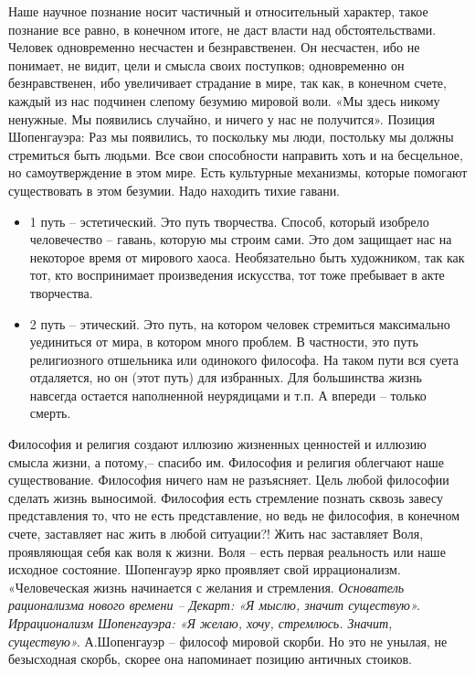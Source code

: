 \documentclass[12pt]{article}
\begin{document}
Наше научное познание носит частичный и относительный характер, такое познание все равно, в конечном
итоге, не даст власти над обстоятельствами. Человек одновременно несчастен и безнравственен. Он несчастен,
ибо не понимает, не видит, цели и смысла своих поступков; одновременно он безнравственен, ибо увеличивает
страдание в мире, так как, в конечном счете, каждый из нас подчинен слепому безумию мировой воли.
«Мы здесь никому ненужные. Мы появились случайно, и ничего у нас не получится».
Позиция Шопенгауэра: Раз мы появились, то поскольку мы люди, постольку мы должны стремиться быть
людьми.  Все  свои  способности  направить  хоть  и  на  бесцельное,  но  самоутверждение  в  этом  мире.  Есть
культурные механизмы, которые помогают существовать в этом безумии. Надо находить тихие гавани.
\begin{itemize}
\item 1 путь – эстетический. Это путь творчества. Способ, который изобрело человечество – гавань, которую мы 
строим сами. Это дом защищает нас на некоторое время от мирового хаоса. Необязательно быть художником,
так как тот, кто воспринимает произведения искусства, тот тоже пребывает в акте творчества.
\item 2 путь – этический. Это путь, на котором человек стремиться максимально уединиться от мира, в котором много
проблем. В частности, это путь религиозного отшельника или одинокого философа. На таком пути вся суета
отдаляется,  но  он  (этот  путь)  для  избранных.  Для  большинства  жизнь  навсегда  остается  наполненной
неурядицами и т.п. А впереди – только смерть.
\end{itemize}
Философия и религия создают иллюзию жизненных ценностей и иллюзию смысла жизни, а потому,– спасибо
им. Философия и религия облегчают наше существование.
Философия ничего нам не разъясняет. Цель любой философии сделать жизнь выносимой. Философия есть
стремление познать  сквозь завесу  представления то,  что не есть  представление,  но ведь  не философия,  в
конечном счете, заставляет нас жить в любой ситуации?! Жить нас заставляет Воля, проявляющая себя как воля
к жизни. 
Воля – есть первая реальность или наше исходное состояние.
Шопенгауэр ярко проявляет свой иррационализм. «Человеческая жизнь начинается с желания и стремления.
\textit{
Основатель  рационализма  нового  времени  –  Декарт:  «Я  мыслю,  значит  существую».  Иррационализм
Шопенгауэра: «Я желаю, хочу, стремлюсь. Значит, существую».}
А.Шопенгауэр – философ мировой скорби. Но это не унылая, не безысходная скорбь, скорее она напоминает
позицию античных стоиков.
\end{document}
